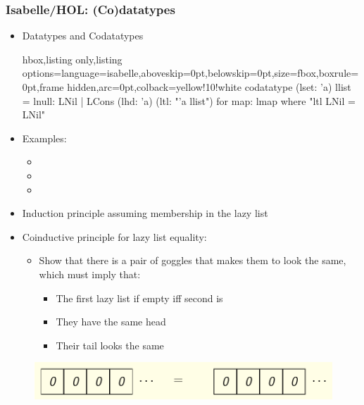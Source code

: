 \documentclass[aspectratio=169,10pt]{beamer}
\begin{document}
\begin{frame}
  \frametitle{Isabelle/HOL: (Co)datatypes}
  \begin{itemize}
    \item Datatypes and Codatatypes
          \begin{tcblisting}{hbox,listing only,listing options={language=isabelle,aboveskip=0pt,belowskip=0pt},size=fbox,boxrule=0pt,frame hidden,arc=0pt,colback=yellow!10!white}
            codatatype (lset: 'a) llist = lnull: LNil | LCons (lhd: 'a) (ltl: "'a llist")
            for map: lmap where "ltl LNil = LNil"
          \end{tcblisting}
    \item Examples:
          \begin{itemize}
            \item {}
            \item {}
            \item {}
          \end{itemize}
    \item Induction principle assuming membership in the lazy list
    \item Coinductive principle for lazy list equality:
          \begin{itemize}
            \item Show that there is a pair of goggles that makes them to look the same, which must imply that:
                  \begin{itemize}
                    \item The first lazy list if empty iff second is
                    \item They have the same head
                    \item Their tail looks the same
                  \end{itemize}
          \end{itemize}
  \end{itemize}
  \begin{figure}
    \centering
    \includegraphics[scale=0.4]{equality.png}
  \end{figure}
\end{frame}
\end{document}

